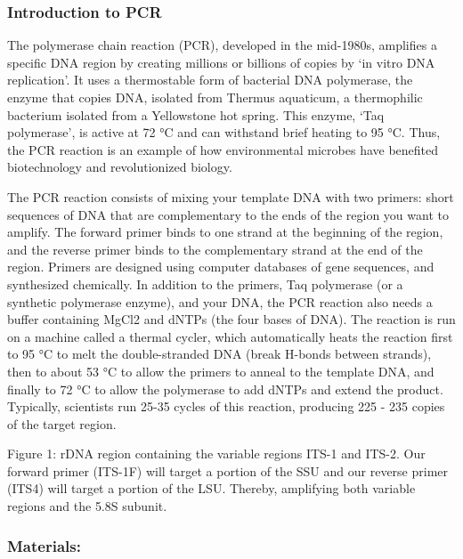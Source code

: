 \documentclass[
  letterpaper,
  DIV=11,
  numbers=noendperiod]{scrreprt}
\begin{document}
\subsubsection*{Introduction to PCR}\label{introduction-to-pcr}

The polymerase chain reaction (PCR), developed in the mid-1980s,
amplifies a specific DNA region by creating millions or billions of
copies by `in vitro DNA replication'. It uses a thermostable form of
bacterial DNA polymerase, the enzyme that copies DNA, isolated from
Thermus aquaticum, a thermophilic bacterium isolated from a Yellowstone
hot spring. This enzyme, `Taq polymerase', is active at 72 °C and can
withstand brief heating to 95 °C. Thus, the PCR reaction is an example
of how environmental microbes have benefited biotechnology and
revolutionized biology.

The PCR reaction consists of mixing your template DNA with two primers:
short sequences of DNA that are complementary to the ends of the region
you want to amplify. The forward primer binds to one strand at the
beginning of the region, and the reverse primer binds to the
complementary strand at the end of the region. Primers are designed
using computer databases of gene sequences, and synthesized chemically.
In addition to the primers, Taq polymerase (or a synthetic polymerase
enzyme), and your DNA, the PCR reaction also needs a buffer containing
MgCl2 and dNTPs (the four bases of DNA). The reaction is run on a
machine called a thermal cycler, which automatically heats the reaction
first to 95 °C to melt the double-stranded DNA (break H-bonds between
strands), then to about 53 °C to allow the primers to anneal to the
template DNA, and finally to 72 °C to allow the polymerase to add dNTPs
and extend the product. Typically, scientists run 25-35 cycles of this
reaction, producing 225 - 235 copies of the target region.

Figure 1: rDNA region containing the variable regions ITS-1 and ITS-2.
Our forward primer (ITS-1F) will target a portion of the SSU and our
reverse primer (ITS4) will target a portion of the LSU. Thereby,
amplifying both variable regions and the 5.8S subunit.

\subsubsection*{Materials:}\label{materials-1}
\end{document}
